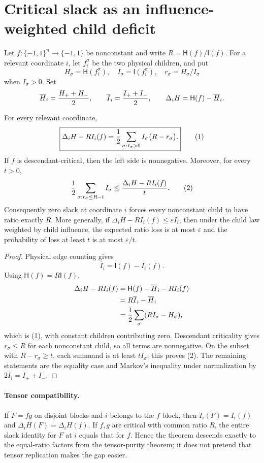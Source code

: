 \section*{Critical slack as an influence-weighted child deficit}

Let $f:\{-1,1\}^n\to\{-1,1\}$ be nonconstant and write
$R=\mathsf H(f)/\mathsf I(f)$.  For a relevant coordinate $i$, let
$f_i^\sigma$ be the two physical children, and put
\[
 H_\sigma=\mathsf H(f_i^\sigma),\quad
 I_\sigma=\mathsf I(f_i^\sigma),\quad
 r_\sigma=H_\sigma/I_\sigma
\]
when $I_\sigma>0$.  Set
\[
 \overline H_i={H_++H_-\over2},\qquad
 \overline I_i={I_++I_-\over2},\qquad
 \Delta_iH=\mathsf H(f)-\overline H_i.
\]

\begin{theorem}
For every relevant coordinate,
\[
 \boxed{
 \Delta_iH-RI_i(f)
 ={1\over2}\sum_{\sigma:I_\sigma>0}
 I_\sigma\bigl(R-r_\sigma\bigr).}                 \tag{1}
\]
If $f$ is descendant-critical, then the left side is nonnegative.  Moreover,
for every $t>0$,
\[
 {1\over2}\sum_{\sigma:r_\sigma\le R-t}I_\sigma
 \le {\Delta_iH-RI_i(f)\over t}.                 \tag{2}
\]
Consequently zero slack at coordinate $i$ forces every nonconstant child to
have ratio exactly $R$.  More generally, if
$\Delta_iH-RI_i(f)\le\varepsilon\overline I_i$, then under the child law
weighted by child influence, the expected ratio loss is at most
$\varepsilon$ and the probability of loss at least $t$ is at most
$\varepsilon/t$.
\end{theorem}

\begin{proof}
Physical edge counting gives
\[
 \overline I_i=\mathsf I(f)-I_i(f).
\]
Using $\mathsf H(f)=R\mathsf I(f)$,
\begin{align*}
 \Delta_iH-RI_i(f)
 &=\mathsf H(f)-\overline H_i-RI_i(f)\\
 &=R\overline I_i-\overline H_i\\
 &={1\over2}\sum_\sigma(RI_\sigma-H_\sigma),
\end{align*}
which is (1), with constant children contributing zero.  Descendant
criticality gives $r_\sigma\le R$ for each nonconstant child, so all terms
are nonnegative.  On the subset with $R-r_\sigma\ge t$, each summand is at
least $tI_\sigma$; this proves (2).  The remaining statements are the
equality case and Markov's inequality under normalization by
$2\overline I_i=I_++I_-$.
\end{proof}

\paragraph{Tensor compatibility.}
If $F=fg$ on disjoint blocks and $i$ belongs to the $f$ block, then
$I_i(F)=I_i(f)$ and $\Delta_iH(F)=\Delta_iH(f)$.  If $f,g$ are critical
with common ratio $R$, the entire slack identity for $F$ at $i$ equals that
for $f$.  Hence the theorem descends exactly to the equal-ratio factors from
the tensor-purity theorem; it does not pretend that tensor replication makes
the gap easier.


